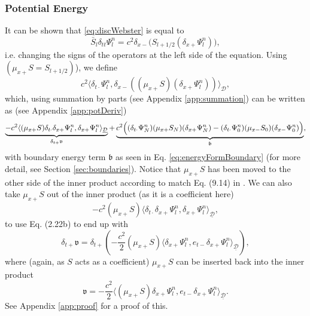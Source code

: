 \documentclass[dvipsnames]{article}
\def\dxp{\delta_{x+}}
\def\dxm{\delta_{x-}}
\def\mup{\mu_{x+}}
\def\mum{\mu_{x-}}
\def\Sp{S_{l+1/2}}
\def\Psiln{\Psi_l^n}
\def\Sbar{\bar S_l}
\def\dtd{\delta_{t\cdot}}
\begin{document}
\subsubsection{Potential Energy}
It can be shown that \eqref{eq:discWebster} is equal to
\begin{equation}
    \Sbar \delta_{tt}\Psi^n_l = c^2\dxm\big(\Sp(\dxp\Psiln)\big),
\end{equation}
i.e. changing the signs of the operators at the left side of the equation. Using $(\mup S = S_{l+1/2})$), we define
\begin{equation}\label{eq:potContEnergy}
c^2\langle \dtd\Psiln, \dxm((\mup S)(\dxp\Psiln))\rangle_\mathcal{D},
\end{equation}
which, using summation by parts (see Appendix \ref{app:summation}) can be written as (see Appendix \ref{app:potDeriv})
\begin{equation}\label{eq:discROCPotBound}
\underbrace{-c^2\langle(\mu_{x+}S)\dtd\dxp\Psiln, \dxp\Psiln\rangle_{\underline{\mathcal{D}}}}_{\let\scriptstyle\textstyle\delta_{t+}\mathfrak{v}} + \underbrace{c^2\Big( (\dtd\Psi_N^n)(\mup S_N)(\dxp\Psi_N^n) -(\dtd\Psi_0^n)(\mum S_0)(\dxm \Psi_0^n)\Big)}_{\mathfrak{b}},
\end{equation}
with boundary energy term $\mathfrak{b}$ as seen in Eq. \eqref{eq:energyFormBoundary} (for more detail, see Section \ref{sec:boundaries}).
Notice that $\mup S$ has been moved to the other side of the inner product according to match Eq. (9.14) in \cite{Bilbao2009}. We can also take $\mup S$ out of the inner product (as it is a coefficient here)
\begin{equation}
    -c^2(\mu_{x+}S)\langle\dtd\dxp\Psiln, \dxp\Psiln\rangle_{\underline{\mathcal{D}}},
\end{equation}
to use Eq. (2.22b) to end up with 
\begin{equation}
    \delta_{t+}\mathfrak{v} = \delta_{t+}\left(-\frac{c^2}{2}(\mu_{x+}S)\langle\dxp\Psiln, e_{t-}\dxp\Psiln\rangle_{\underline{\mathcal{D}}}\right),
\end{equation}
where (again, as $S$ acts as a coefficient) $\mup S$ can be inserted back into the inner product
\begin{equation}
   \mathfrak{v}=-\frac{c^2}{2}\langle(\mu_{x+}S)\dxp\Psiln, e_{t-}\dxp\Psiln\rangle_{\underline{\mathcal{D}}}.
\end{equation}
See Appendix \ref{app:proof} for a proof of this.
\end{document}
